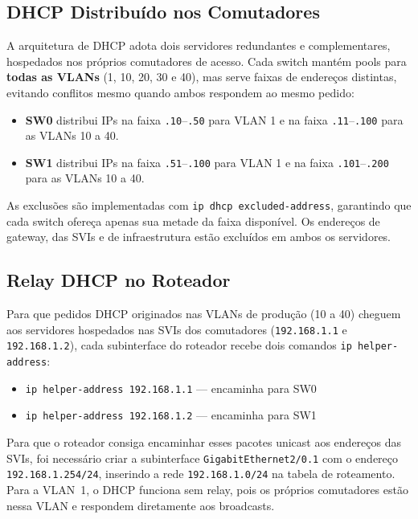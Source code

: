 \documentclass[12pt,a4paper]{article}
\begin{document}
\subsection{DHCP Distribuído nos Comutadores}

A arquitetura de DHCP adota dois servidores redundantes e complementares, hospedados
nos próprios comutadores de acesso. Cada switch mantém pools para \textbf{todas as
VLANs} (1, 10, 20, 30 e 40), mas serve faixas de endereços distintas, evitando
conflitos mesmo quando ambos respondem ao mesmo pedido:

\begin{itemize}[leftmargin=2em]
  \item \textbf{SW0} distribui IPs na faixa \texttt{.10}--\texttt{.50} para VLAN 1
        e na faixa \texttt{.11}--\texttt{.100} para as VLANs 10 a 40.
  \item \textbf{SW1} distribui IPs na faixa \texttt{.51}--\texttt{.100} para VLAN 1
        e na faixa \texttt{.101}--\texttt{.200} para as VLANs 10 a 40.
\end{itemize}

As exclusões são implementadas com \texttt{ip dhcp excluded-address}, garantindo que
cada switch ofereça apenas sua metade da faixa disponível. Os endereços de gateway,
das SVIs e de infraestrutura estão excluídos em ambos os servidores.

\subsection{Relay DHCP no Roteador}

Para que pedidos DHCP originados nas VLANs de produção (10 a 40) cheguem aos
servidores hospedados nas SVIs dos comutadores (\texttt{192.168.1.1} e
\texttt{192.168.1.2}), cada subinterface do roteador recebe dois comandos
\texttt{ip helper-address}:

\begin{itemize}[leftmargin=2em]
  \item \texttt{ip helper-address 192.168.1.1} --- encaminha para SW0
  \item \texttt{ip helper-address 192.168.1.2} --- encaminha para SW1
\end{itemize}

\begin{sloppypar}
Para que o roteador consiga encaminhar esses pacotes unicast aos endereços das SVIs,
foi necessário criar a subinterface \texttt{GigabitEthernet2/0.1} com o endereço
\texttt{192.168.1.254/24}, inserindo a rede \texttt{192.168.1.0/24} na tabela de
roteamento. Para a VLAN~1, o DHCP funciona sem relay, pois os próprios comutadores
estão nessa VLAN e respondem diretamente aos broadcasts.
\end{sloppypar}
\end{document}
